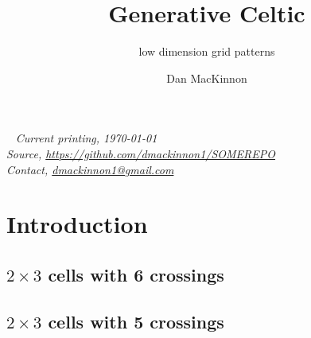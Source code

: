 \documentclass{tufte-book}
\title{Generative Celtic}
\subtitle{low dimension grid patterns}
\author[]{Dan MacKinnon}
\begin{document}
\maketitle


\newpage
\begin{fullwidth}
~\vfill
\thispagestyle{empty}
\setlength{\parindent}{0pt}
\textit{Current printing, \today}\\
\textit{Source, \url{https://github.com/dmackinnon1/SOMEREPO}}\\
\textit{Contact, \href{mailto://dmackinnon1@gmail.com}{dmackinnon1@gmail.com}}
\end{fullwidth}

\cleardoublepage

\chapter*{Introduction}


\newpage

\scalebox{0.6}{
\begin{minipage}{18cm}

\end{minipage}
}

\newpage
\section{$2\times 3$ cells with 6 crossings}


\newpage
\section{$2\times 3$ cells with 5 crossings}

\end{document}
